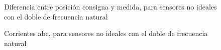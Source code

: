 \documentclass[a4paper, 10pt, onecolumn,journal]{ieeeconf}
\begin{document}
\begin{figure}[H]
	\centering
	\begin{adjustbox}{max width=\columnwidth}
	\end{adjustbox}
	\caption{Diferencia entre posición consigna y medida, para sensores no ideales con el doble de frecuencia natural}
	\label{Diferencia entre posición consigna y medida, para sensores no ideales con el doble de frecuencia natural}
\end{figure}

\begin{figure}[H]
	\centering
	\begin{adjustbox}{max width=\columnwidth}
	\end{adjustbox}
	\caption{Corrientes abc, para sensores no ideales con el doble de frecuencia natural}
	\label{Corrientes abc, para sensores no ideales con el doble de frecuencia natural}
\end{figure}
\end{document}
